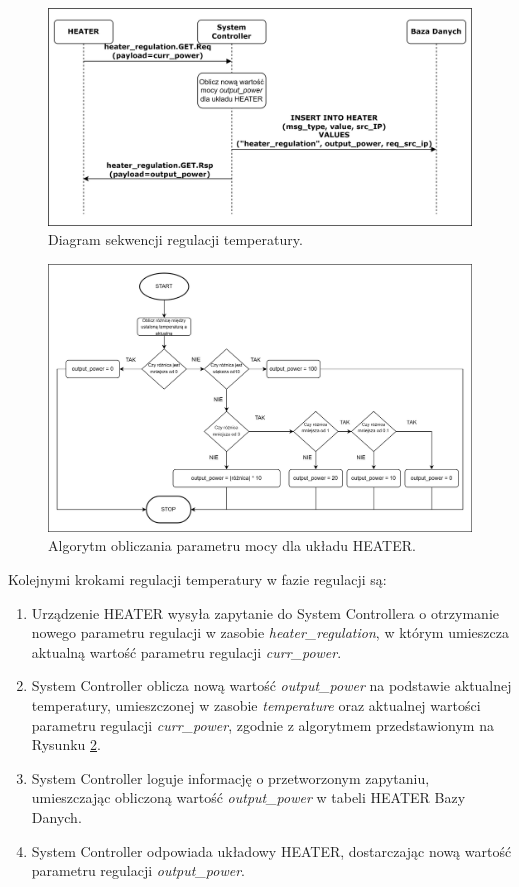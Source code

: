             \begin{figure}[H]
                \centering
                \includegraphics[width=0.8\linewidth]{graphics/sequence-diagrams/heater-regulate-seq.png}
                \caption{Diagram sekwencji regulacji temperatury.}
                \label{fig:seq-heater-regulate}
            \end{figure}

            \begin{figure}[H]
                \centering
                \includegraphics[width=0.8\linewidth]{graphics/heater-block-diagram.png}
                \caption{Algorytm obliczania parametru mocy dla układu HEATER.}
                \label{fig:seq-heater-algo}
            \end{figure}

            Kolejnymi krokami regulacji temperatury w fazie regulacji są:
            \begin{enumerate}
                \item Urządzenie HEATER wysyła zapytanie do System Controllera o otrzymanie nowego parametru regulacji w zasobie \textit{heater\_regulation}, w którym umieszcza aktualną wartość parametru regulacji \textit{curr\_power}.
                \item System Controller oblicza nową wartość \textit{output\_power} na podstawie aktualnej temperatury, umieszczonej w zasobie \textit{temperature} oraz aktualnej wartości parametru regulacji \textit{curr\_power}, zgodnie z algorytmem przedstawionym na Rysunku \ref{fig:seq-heater-algo}.
                \item System Controller loguje informację o przetworzonym zapytaniu, umieszczając obliczoną wartość \textit{output\_power} w tabeli HEATER Bazy Danych.
                \item System Controller odpowiada układowy HEATER, dostarczając nową wartość parametru regulacji \textit{output\_power}.
            \end{enumerate}

